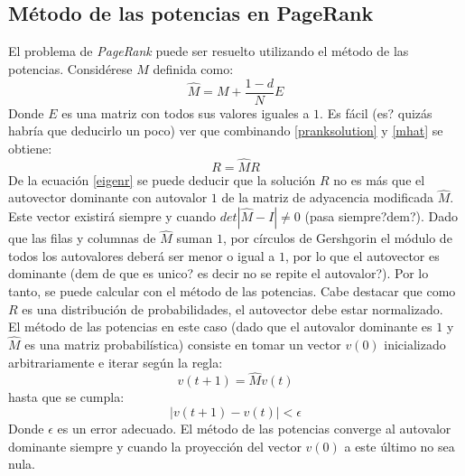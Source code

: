 \documentclass[%
    final,
    reprint,
    notitlepage,
    narroweqnarray,
    inline,
    twoside,
    invited
    ]{ieee}
\begin{document}
\subsection{Método de las potencias en PageRank}
El problema de \textit{PageRank} puede ser resuelto utilizando el método de las potencias. Considérese $\widehat{M}$ definida como:
\begin{equation}\label{mhat}
\widehat{M} = M + \frac{1-d}{N}E
\end{equation}
Donde $E$ es una matriz con todos sus valores iguales a $1$. Es fácil (es? quizás habría que deducirlo un poco) ver que combinando \eqref{pranksolution} 
y \eqref{mhat} se obtiene:
\begin{equation}\label{eigenr}
R = \widehat{M}R
\end{equation}
De la ecuación \eqref{eigenr} se puede deducir que la solución $R$ no es más que el autovector dominante con autovalor $1$ de la matriz de adyacencia 
modificada $\widehat{M}$. Este vector existirá siempre y cuando $det\left|\widehat{M}-I\right| \neq 0 $ (pasa siempre?dem?). Dado que las filas y columnas de 
$\widehat{M}$ suman $1$, por círculos de Gershgorin el módulo de todos los autovalores deberá ser menor o igual a $1$, por lo que el autovector 
es dominante (dem de que es unico? es decir no se repite el autovalor?).
Por lo tanto, se puede calcular con el método de las potencias. Cabe destacar que como 
$R$ es una distribución de probabilidades, el autovector debe estar normalizado.\\
El método de las potencias en este caso (dado que el autovalor dominante es $1$ y $\widehat{M}$ es una matriz probabilística) 
consiste en tomar un vector $v(0)$ inicializado 
arbitrariamente e iterar según la regla:
\begin{equation}
v(t+1) = \widehat{M}v(t)
\end{equation} 
hasta que se cumpla:
\begin{equation}
\left| v(t+1) - v(t) \right| < \epsilon
\end{equation}
Donde $\epsilon$ es un error adecuado. El método de las potencias converge al autovalor dominante siempre y cuando la proyección del vector $v(0)$ a este 
último no sea nula.

%
%
%
%
%
\end{document}
